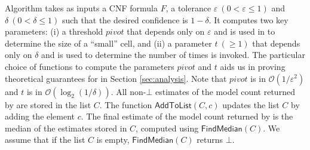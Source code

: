 \noindent
Algorithm {\ApproxMC} takes as inputs a CNF formula $F$, a tolerance
$\varepsilon ~(0 < \varepsilon \le 1)$ and $\delta ~(0 < \delta \le
1)$ such that the desired confidence is $1-\delta$.  It computes two
key parameters: (i) a threshold $\mathit{pivot}$ that depends only on
$\varepsilon$ and is used in {\ApproxMCCore} to determine the size of
a ``small'' cell, and (ii) a parameter $t ~(\ge 1)$ that depends only
on $\delta$ and is used to determine the number of times
{\ApproxMCCore} is invoked. The particular choice of functions to
compute the parameters $\mathit{pivot}$ and $t$ aids us in proving
theoretical guarantees for {\ApproxMC} in Section
\ref{sec:analysis}. Note that $\mathit{pivot}$ is in
$\mathcal{O}(1/\varepsilon^2)$ and $t$ is in $\mathcal{O}(\log_2 (1/\delta))$.  All non-$\bot$
estimates of the model count returned by {\ApproxMCCore} are stored in
the list $C$.  The function $\mathsf{AddToList}(C, c)$ updates the
list $C$ by adding the element $c$.  The final estimate of the model
count returned by {\ApproxMC} is the median of the estimates stored in
$C$, computed using $\mathsf{FindMedian}(C)$.  We assume that if the list $C$ is
empty, $\mathsf{FindMedian}(C)$ returns $\bot$.
%
%

